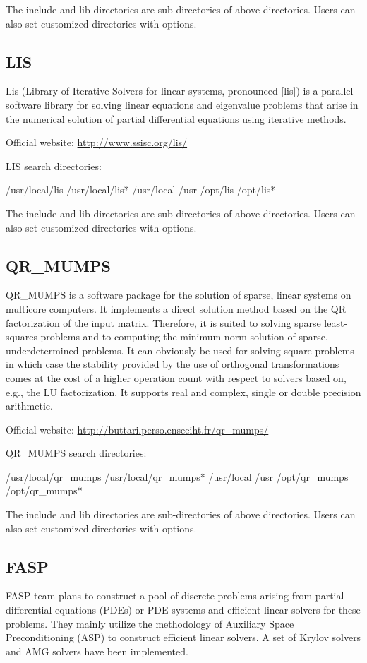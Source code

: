 The include and lib directories are sub-directories of above directories. Users can also set customized directories with options.

\subsection{LIS}
Lis (Library of Iterative Solvers for linear systems, pronounced [lis]) is a parallel software library for solving linear equations and eigenvalue problems that arise in the numerical solution of partial differential equations using iterative methods.

Official website: \url{http://www.ssisc.org/lis/}

LIS search directories:
\begin{evb}
/usr/local/lis
/usr/local/lis*
/usr/local
/usr
/opt/lis 
/opt/lis*
\end{evb}

The include and lib directories are sub-directories of above directories. Users can also set customized directories with options.

\subsection{QR\_MUMPS}
QR\_MUMPS is a software package for the solution of sparse, linear systems on multicore computers. It implements a direct solution method based on the QR factorization of the input matrix. Therefore, it is suited to solving sparse least-squares problems and to computing the minimum-norm solution of sparse, underdetermined problems. It can obviously be used for solving square problems in which case the stability provided by the use of orthogonal transformations comes at the cost of a higher operation count with respect to solvers based on, e.g., the LU factorization. It supports real and complex, single or double precision arithmetic. 

Official website: \url{http://buttari.perso.enseeiht.fr/qr_mumps/}

QR\_MUMPS search directories:
\begin{evb}
/usr/local/qr_mumps
/usr/local/qr_mumps*
/usr/local
/usr
/opt/qr_mumps 
/opt/qr_mumps*
\end{evb}

The include and lib directories are sub-directories of above directories. Users can also set customized directories with options.


\subsection{FASP}
FASP team plans to construct a pool of discrete problems arising from partial differential equations (PDEs) or PDE systems and efficient linear solvers for these problems. They mainly utilize the methodology of Auxiliary Space Preconditioning (ASP) to construct efficient linear solvers. A set of Krylov solvers and AMG solvers have been implemented. 

